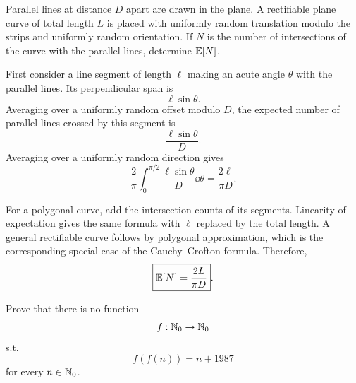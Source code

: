     \begin{expectedproblem}
        Parallel lines at distance $D$ apart are drawn in the plane. A
        rectifiable plane curve of total length $L$ is placed with uniformly
        random translation modulo the strips and uniformly random orientation.
        If $N$ is the number of intersections of the curve with the parallel
        lines, determine $\mathbb{E}[N]$.
    \end{expectedproblem}

    \begin{solution}
        First consider a line segment of length $\ell$ making an acute angle
        $\theta$ with the parallel lines. Its perpendicular span is
        \[
            \ell\sin\theta.
        \]
        Averaging over a uniformly random offset modulo $D$, the expected number
        of parallel lines crossed by this segment is
        \[
            \frac{\ell\sin\theta}{D}.
        \]
        Averaging over a uniformly random direction gives
        \[
            \frac{2}{\pi}
            \int_0^{\pi/2}
            \frac{\ell\sin\theta}{D}\dd\theta
            =
            \frac{2\ell}{\pi D}.
        \]

        For a polygonal curve, add the intersection counts of its segments.
        Linearity of expectation gives the same formula with $\ell$ replaced by
        the total length. A general rectifiable curve follows by polygonal
        approximation, which is the corresponding special case of the
        Cauchy--Crofton formula. Therefore,
        \[
            \boxed{\mathbb{E}[N]=\frac{2L}{\pi D}}.
        \]
    \end{solution}

    \begin{expectedproblem}[1987 IMO]
        Prove that there is no function
        \[
            f:\mathbb{N}_0\to\mathbb{N}_0
        \]
        s.t.
        \[
            f(f(n))=n+1987
        \]
        for every $n\in\mathbb{N}_0$.
    \end{expectedproblem}

